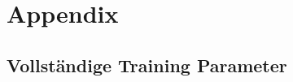 \chapter*{Appendix}\label{ch:appendix}

\section{Vollständige Training Parameter}\label{app:sec:trainingparameter}